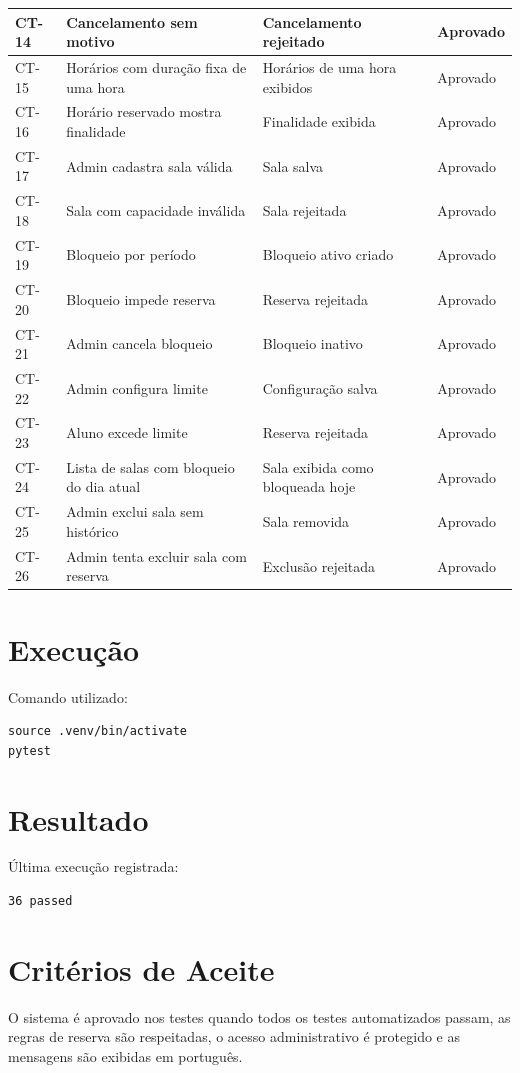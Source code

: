 \documentclass[12pt,a4paper]{article}
\begin{document}
\begin{longtable}{|p{1.6cm}|p{6.2cm}|p{5.4cm}|p{1.8cm}|}
CT-14 & Cancelamento sem motivo & Cancelamento rejeitado & Aprovado \\ \hline
CT-15 & Horários com duração fixa de uma hora & Horários de uma hora exibidos & Aprovado \\ \hline
CT-16 & Horário reservado mostra finalidade & Finalidade exibida & Aprovado \\ \hline
CT-17 & Admin cadastra sala válida & Sala salva & Aprovado \\ \hline
CT-18 & Sala com capacidade inválida & Sala rejeitada & Aprovado \\ \hline
CT-19 & Bloqueio por período & Bloqueio ativo criado & Aprovado \\ \hline
CT-20 & Bloqueio impede reserva & Reserva rejeitada & Aprovado \\ \hline
CT-21 & Admin cancela bloqueio & Bloqueio inativo & Aprovado \\ \hline
CT-22 & Admin configura limite & Configuração salva & Aprovado \\ \hline
CT-23 & Aluno excede limite & Reserva rejeitada & Aprovado \\ \hline
CT-24 & Lista de salas com bloqueio do dia atual & Sala exibida como bloqueada hoje & Aprovado \\ \hline
CT-25 & Admin exclui sala sem histórico & Sala removida & Aprovado \\ \hline
CT-26 & Admin tenta excluir sala com reserva & Exclusão rejeitada & Aprovado \\ \hline
\end{longtable}

\section{Execução}
Comando utilizado:
\begin{verbatim}
source .venv/bin/activate
pytest
\end{verbatim}

\section{Resultado}
Última execução registrada:
\begin{verbatim}
36 passed
\end{verbatim}

\section{Critérios de Aceite}
O sistema é aprovado nos testes quando todos os testes automatizados passam, as regras de reserva são respeitadas, o acesso administrativo é protegido e as mensagens são exibidas em português.
\end{document}
